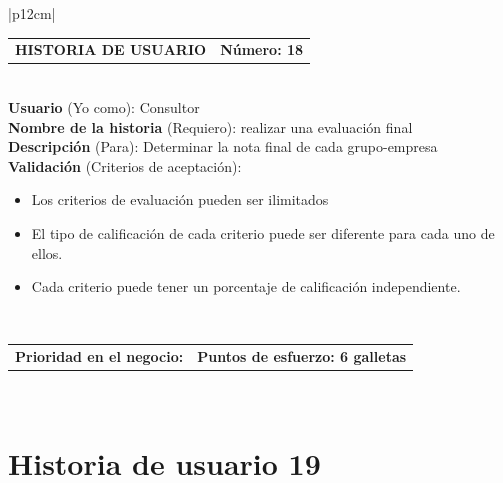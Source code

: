 \documentclass[11pt,letterpaper]{report}
\begin{document}
	\begin{center}	
		\begin{tabular}{|p{12cm}|}
			\hline
			\begin{tabular}{c|c}
				\textbf{HISTORIA DE USUARIO} & \textbf{Número: 18} \\
			\end{tabular} \\ \hline
			\textbf{Usuario} (Yo como): Consultor \\ \hline
			\textbf{Nombre de la historia} (Requiero): realizar una evaluación final \\ \hline
			\textbf{Descripción} (Para): Determinar la nota final de cada grupo-empresa \\ \hline
			\textbf{Validación} (Criterios de aceptación): \\
			\begin{minipage}{12cm}
				\begin{itemize}
					\item Los criterios de evaluación pueden ser ilimitados
					\item El tipo de calificación de cada criterio puede ser diferente para cada uno de ellos.
					\item Cada criterio puede tener un porcentaje de calificación independiente.
				\end{itemize}
			\end{minipage} \\ \hline
			\begin{tabular}{p{6cm}|c}
				\textbf{Prioridad en el negocio: } & \textbf{Puntos de esfuerzo: 6 galletas} \\
			\end{tabular} \\ \hline
		\end{tabular}
	\end{center}
	
	\section{Historia de usuario 19}	
	
\end{document}
